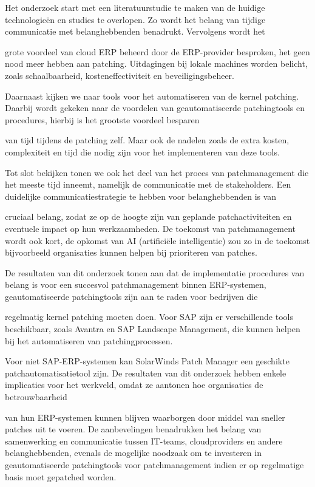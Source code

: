 Het onderzoek start met een literatuurstudie te maken van de huidige technologieën en studies te overlopen. Zo wordt het belang van tijdige communicatie met belanghebbenden benadrukt. Vervolgens wordt het 

grote voordeel van cloud ERP beheerd door de ERP-provider besproken, het geen nood meer hebben aan patching. Uitdagingen bij lokale machines worden belicht, zoals schaalbaarheid, kosteneffectiviteit en beveiligingsbeheer.

Daarnaast kijken we naar tools voor het automatiseren van de kernel patching. Daarbij wordt gekeken naar de voordelen van geautomatiseerde patchingtools en procedures, hierbij is het grootste voordeel besparen 

van tijd tijdens de patching zelf. Maar ook de nadelen zoals de extra kosten, complexiteit en tijd die nodig zijn voor het implementeren van deze tools.

Tot slot bekijken tonen we ook het deel van het proces van patchmanagement die het meeste tijd inneemt, namelijk de communicatie met de stakeholders. Een duidelijke communicatiestrategie te hebben voor belanghebbenden is van 

cruciaal belang, zodat ze op de hoogte zijn van geplande patchactiviteiten en eventuele impact op hun werkzaamheden. De toekomst van patchmanagement wordt ook kort, de opkomst van AI (artificiële intelligentie) zou zo in de toekomst bijvoorbeeld organisaties kunnen helpen bij prioriteren van patches.

De resultaten van dit onderzoek tonen aan dat de implementatie procedures van belang is voor een succesvol patchmanagement binnen ERP-systemen, geautomatiseerde patchingtools zijn aan te raden voor bedrijven die 

regelmatig kernel patching moeten doen. Voor SAP zijn er verschillende tools beschikbaar, zoals Avantra en SAP Landscape Management, die kunnen helpen bij het automatiseren van patchingprocessen. 

Voor niet SAP-ERP-systemen kan SolarWinds Patch Manager een geschikte patchautomatisatietool zijn. De resultaten van dit onderzoek hebben enkele implicaties voor het werkveld, omdat ze aantonen hoe organisaties de betrouwbaarheid 

van hun ERP-systemen kunnen blijven waarborgen door middel van sneller patches uit te voeren. De aanbevelingen benadrukken het belang van samenwerking en communicatie tussen IT-teams, cloudproviders en andere belanghebbenden, evenals de mogelijke noodzaak om te investeren in geautomatiseerde patchingtools voor patchmanagement indien er op regelmatige basis moet gepatched worden.